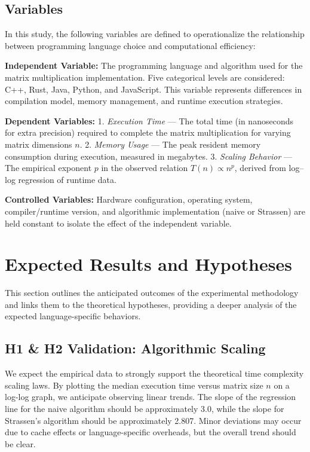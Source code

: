 \documentclass[11pt, a4paper, titlepage]{scrartcl}
\begin{document}
\subsection{Variables}

In this study, the following variables are defined to operationalize the relationship between programming language choice and computational efficiency:

\textbf{Independent Variable:}  
The programming language and algorithm used for the matrix multiplication implementation. Five categorical levels are considered: C++, Rust, Java, Python, and JavaScript. This variable represents differences in compilation model, memory management, and runtime execution strategies.

\textbf{Dependent Variables:}  
1. \textit{Execution Time} — The total time (in nanoseconds for extra precision) required to complete the matrix multiplication for varying matrix dimensions \(n\).  
2. \textit{Memory Usage} — The peak resident memory consumption during execution, measured in megabytes.  
3. \textit{Scaling Behavior} — The empirical exponent \(p\) in the observed relation \(T(n) \propto n^p\), derived from log–log regression of runtime data.

\textbf{Controlled Variables:}  
Hardware configuration, operating system, compiler/runtime version, and algorithmic implementation (naive or Strassen) are held constant to isolate the effect of the independent variable.

\newpage

\section{Expected Results and Hypotheses}

This section outlines the anticipated outcomes of the experimental methodology and links them to the theoretical hypotheses, providing a deeper analysis of the expected language-specific behaviors.

\subsection{H1 \& H2 Validation: Algorithmic Scaling}
We expect the empirical data to strongly support the theoretical time complexity scaling laws. By plotting the median execution time versus matrix size \(n\) on a log-log graph, we anticipate observing linear trends. The slope of the regression line for the naive algorithm should be approximately 3.0, while the slope for Strassen's algorithm should be approximately 2.807. Minor deviations may occur due to cache effects or language-specific overheads, but the overall trend should be clear.
\end{document}
